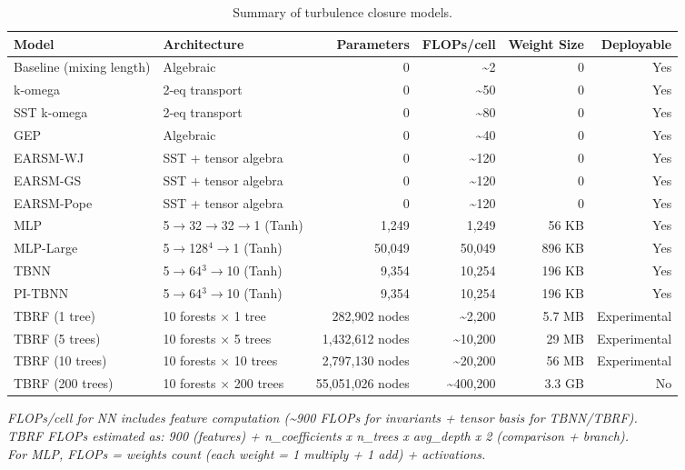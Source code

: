 \begin{table}[htbp]
\centering
\caption{Summary of turbulence closure models.}
\label{tab:model_summary}
\begin{tabular}{llrrrr}
\toprule
\textbf{Model} & \textbf{Architecture} & \textbf{Parameters} & \textbf{FLOPs/cell} & \textbf{Weight Size} & \textbf{Deployable} \\
\midrule
Baseline (mixing length) & Algebraic & 0 & \textasciitilde{}2 & 0 & Yes \\
k-omega & 2-eq transport & 0 & \textasciitilde{}50 & 0 & Yes \\
SST k-omega & 2-eq transport & 0 & \textasciitilde{}80 & 0 & Yes \\
GEP & Algebraic & 0 & \textasciitilde{}40 & 0 & Yes \\
EARSM-WJ & SST + tensor algebra & 0 & \textasciitilde{}120 & 0 & Yes \\
EARSM-GS & SST + tensor algebra & 0 & \textasciitilde{}120 & 0 & Yes \\
EARSM-Pope & SST + tensor algebra & 0 & \textasciitilde{}120 & 0 & Yes \\
MLP & 5$\to$32$\to$32$\to$1 (Tanh) & 1,249 & 1,249 & 56 KB & Yes \\
MLP-Large & 5$\to$128$^4\to$1 (Tanh) & 50,049 & 50,049 & 896 KB & Yes \\
TBNN & 5$\to$64$^3\to$10 (Tanh) & 9,354 & 10,254 & 196 KB & Yes \\
PI-TBNN & 5$\to$64$^3\to$10 (Tanh) & 9,354 & 10,254 & 196 KB & Yes \\
TBRF (1 tree) & 10 forests $\times$ 1 tree & 282,902 nodes & \textasciitilde{}2,200 & 5.7 MB & Experimental \\
TBRF (5 trees) & 10 forests $\times$ 5 trees & 1,432,612 nodes & \textasciitilde{}10,200 & 29 MB & Experimental \\
TBRF (10 trees) & 10 forests $\times$ 10 trees & 2,797,130 nodes & \textasciitilde{}20,200 & 56 MB & Experimental \\
TBRF (200 trees) & 10 forests $\times$ 200 trees & 55,051,026 nodes & \textasciitilde{}400,200 & 3.3 GB & No \\
\bottomrule
\end{tabular}
\vspace{2pt}
\begin{minipage}{\linewidth}
\footnotesize
\textit{FLOPs/cell for NN includes feature computation (\textasciitilde{}900 FLOPs for invariants + tensor basis for TBNN/TBRF).}
\\
\textit{TBRF FLOPs estimated as: 900 (features) + n_coefficients x n_trees x avg_depth x 2 (comparison + branch).}
\\
\textit{For MLP, FLOPs = weights count (each weight = 1 multiply + 1 add) + activations.}
\\
\end{minipage}
\end{table}

